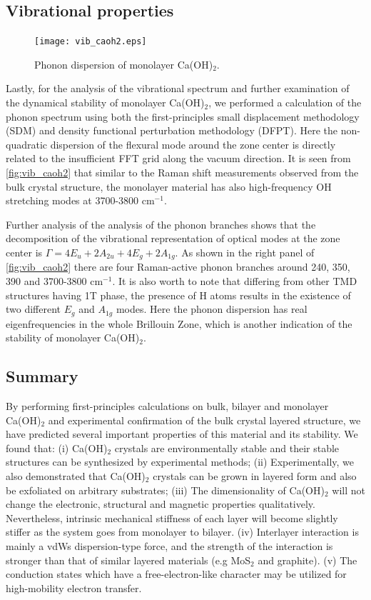 \subsection{Vibrational properties}\label{stability}
\begin{figure}[htb]
\centering
\texttt{[image: vib\_caoh2.eps]}
\caption{\label{fig:vib_caoh2} Phonon dispersion of monolayer Ca(OH)$_2$.}
\end{figure}

Lastly, for the analysis of the vibrational spectrum and further examination of 
the dynamical stability of monolayer Ca(OH)$_2$, we performed a 
calculation of the phonon spectrum using both the first-principles small 
displacement methodology (SDM)\cite{alfe} and density functional perturbation 
methodology (DFPT)\cite{baroni}. Here the non-quadratic dispersion of the 
flexural mode around the zone center is directly related to the insufficient 
FFT grid along the vacuum direction. It is seen from \autoref{fig:vib_caoh2} that 
similar to the Raman shift measurements observed from the bulk crystal 
structure, the monolayer material has also high-frequency OH stretching 
modes at 3700-3800 cm$^{-1}$. 

Further analysis of the analysis of the phonon 
branches shows that the decomposition of the vibrational representation of optical 
modes at the zone center is $\Gamma = 4E_{u} + 2A_{2u} + 4E_{g} + 2A_{1g}$. As 
shown in the right panel of \autoref{fig:vib_caoh2} there are four Raman-active phonon 
branches around 240, 350, 390 and 3700-3800 cm$^{-1}$. It is also worth to note 
that differing from other TMD structures having 1T phase, the presence of H atoms 
results in the existence of two different $E_{g}$ and $A_{1g}$ modes. Here the 
phonon dispersion has real eigenfrequencies in the whole Brillouin Zone, 
which is another indication of the stability of monolayer Ca(OH)$_2$.

\subsection{Summary}\label{disc}

By performing first-principles calculations on bulk, bilayer and 
monolayer Ca(OH)$_2$ and experimental confirmation of the bulk crystal 
layered structure, we have predicted several important properties of this 
material and its stability. We found that: (i) Ca(OH)$_2$ crystals are 
environmentally stable and their stable structures can be synthesized by 
experimental methods; (ii) Experimentally, we also demonstrated that Ca(OH)$_2$ 
crystals can be grown in layered form and also be exfoliated on arbitrary 
substrates; (iii) The dimensionality of Ca(OH)$_2$ will not change the 
electronic, structural and magnetic properties qualitatively. Nevertheless, intrinsic mechanical stiffness of each layer will become slightly stiffer as 
the system goes from monolayer to bilayer. (iv) Interlayer interaction is mainly a
vdWs dispersion-type force, and
the strength of the interaction is stronger than that of similar layered
materials (e.g MoS$_2$ and graphite). (v) The 
conduction states which have a free-electron-like character may be utilized for 
high-mobility electron transfer. 

